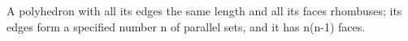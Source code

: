  A polyhedron with all its edges the same length and all its
faces rhombuses; its edges form a specified number n of
parallel sets, and it has n(n-1) faces.
